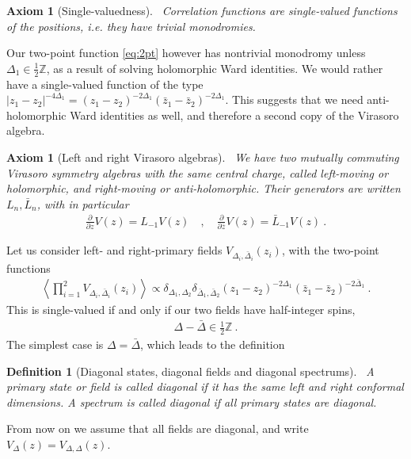 \documentclass[12pt, a4paper]{article}
\theoremstyle{break}
\newtheorem{hyp}[exo]{Axiom}
\newtheorem{defn}[exo]{Definition}
\begin{document}
\begin{hyp}[Single-valuedness]
 ~\label{hyp:sv}
 Correlation functions are single-valued functions of the positions, i.e. they have trivial monodromies.
\end{hyp}

Our two-point function \eqref{eq:2pt} however has nontrivial monodromy unless $\Delta_1\in \frac12\mathbb{Z}$, as a  result of solving holomorphic Ward identities. 
We would rather have a single-valued function of the type $|z_1-z_2|^{-4\Delta_1} = (z_1-z_2)^{-2\Delta_1} (\bar z_1-\bar z_2)^{-2\Delta_1}$.
This suggests that we need anti-holomorphic Ward identities as well, and therefore a second copy of the Virasoro algebra.

\begin{hyp}[Left and right Virasoro algebras]
 ~\label{hyp:lr}
 We have two mutually commuting Virasoro symmetry algebras with the same central charge, called left-moving or holomorphic, and right-moving or anti-holomorphic. Their generators are written $L_n,\bar L_n$, with in particular
 \begin{align}
  \frac{\partial}{\partial z} V(z) = L_{-1}V(z)   \quad , \quad \frac{\partial}{\partial \bar z} V(z)= \bar L_{-1} V(z)   \ .
 \end{align}
\end{hyp}

Let us consider left- and right-primary fields $V_{\Delta_i,\bar\Delta_i}(z_i)$, with the 
two-point functions
\begin{align}
 \left<\prod_{i=1}^2 V_{\Delta_i,\bar\Delta_i}(z_i) \right> \propto \delta_{\Delta_1,\Delta_2}\delta_{\bar\Delta_1,\bar\Delta_2} (z_1-z_2)^{-2\Delta_1} (\bar z_1-\bar z_2)^{-2\bar\Delta_1}\ .
\end{align}
This is single-valued if and only if our two fields have half-integer spins,
\begin{align}
 \Delta -\bar \Delta \in \frac12\mathbb{Z}\ .
\end{align} 
The simplest case is $\Delta=\bar\Delta$, which leads to the definition

\begin{defn}[Diagonal states, diagonal fields and diagonal spectrums]
 ~\label{def:diag}
 A primary state or field is called diagonal if it has the same left and right conformal dimensions. A spectrum is called diagonal if all primary states are diagonal.
\end{defn}
From now on we assume that all fields are diagonal, and write  $V_\Delta(z) = V_{\Delta,\Delta}(z)$.
\end{document}
